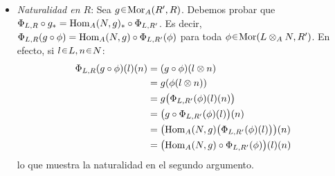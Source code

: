 \begin{sol}
\begin{itemize}
    \item\emph{Naturalidad en $R$}: Sea $g\en\hom_A(R',R)$. Debemos probar que $\Phi_{L,R}\circ g_* = \operatorname{Hom}_A(N,g)_* \circ \Phi_{L,R'}$.
    Es decir, $\Phi_{L,R}(g\circ\phi) = \operatorname{Hom}_A(N,g)\circ \Phi_{L,R'}(\phi)$ para toda $\phi\en\hom(L\otimes_AN,R')$. En efecto, si $l\en L,n\en N$:
    \[\begin{aligned}
    \Phi_{L,R}(g\circ\phi)(l)(n)
    &= (g\circ\phi)(l\otimes n)\\
    &= g(\phi(l\otimes n))\\
    &= g\bigl( \Phi_{L,R'}(\phi)(l)(n) \bigr)\\
    &=\bigl( g\circ\Phi_{L,R'}(\phi)(l) \bigr)(n)\\
    &= \bigl( \operatorname{Hom}_A(N,g)\bigl( \Phi_{L,R'}(\phi)(l) \bigr) \bigr)(n)\\
    &= \bigl( \operatorname{Hom}_A(N,g)\circ \Phi_{L,R'}(\phi) \bigr)(l)(n)
    \end{aligned}\]
    lo que muestra la naturalidad en el segundo argumento.
\end{itemize}
\end{sol}